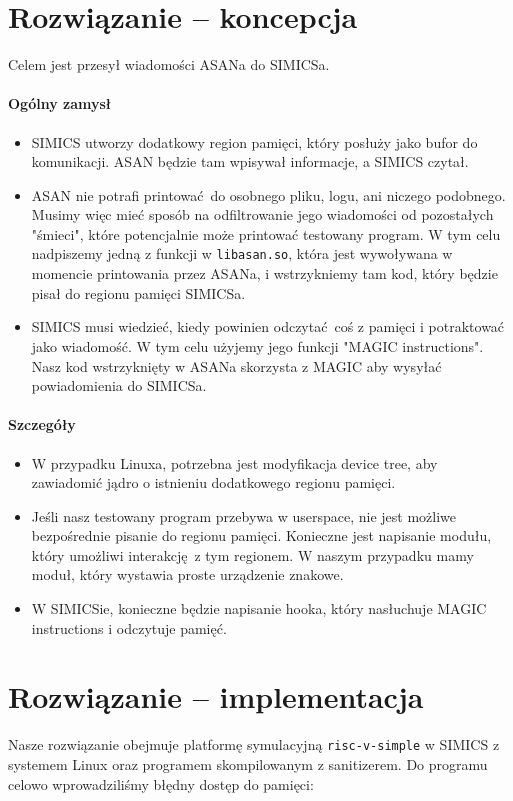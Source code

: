 \documentclass[../main.tex]{subfiles}
\begin{document}
	
	
\section{Rozwiązanie -- koncepcja}
Celem jest przesył wiadomości ASANa do SIMICSa.

\paragraph{Ogólny zamysł}
\begin{itemize}
	\item SIMICS utworzy dodatkowy region pamięci, który posłuży jako bufor do
		komunikacji. ASAN będzie tam wpisywał informacje, a SIMICS czytał.
	\item ASAN nie potrafi printować do osobnego pliku, logu, ani niczego
		podobnego. Musimy więc mieć sposób na odfiltrowanie jego wiadomości od
		pozostałych "śmieci", które potencjalnie może printować testowany
		program. W tym celu nadpiszemy jedną z funkcji w
		\texttt{libasan.so}, która jest wywoływana w momencie
		printowania przez ASANa, i wstrzykniemy tam kod, który będzie pisał do
		regionu pamięci SIMICSa.
	\item SIMICS musi wiedzieć, kiedy powinien odczytać coś z pamięci i
		potraktować jako wiadomość. W tym celu użyjemy jego funkcji "MAGIC
		instructions". Nasz kod wstrzyknięty w ASANa skorzysta z MAGIC aby
		wysyłać powiadomienia do SIMICSa.
\end{itemize}

\paragraph{Szczegóły}
\begin{itemize}
	\item W przypadku Linuxa, potrzebna jest modyfikacja device tree, aby
		zawiadomić jądro o istnieniu dodatkowego regionu pamięci.
	\item Jeśli nasz testowany program przebywa w userspace, nie jest możliwe
		bezpośrednie pisanie do regionu pamięci. Konieczne jest napisanie
		modułu, który umożliwi interakcję z tym regionem. W naszym przypadku
		mamy moduł, który wystawia proste urządzenie znakowe.
	\item W SIMICSie, konieczne będzie napisanie hooka, który nasłuchuje MAGIC
		instructions i odczytuje pamięć.
\end{itemize}


\section{Rozwiązanie -- implementacja}
Nasze rozwiązanie obejmuje platformę symulacyjną \texttt{risc-v-simple} w SIMICS z systemem Linux oraz programem skompilowanym z sanitizerem. Do programu celowo wprowadziliśmy błędny dostęp do pamięci:
\end{document}
